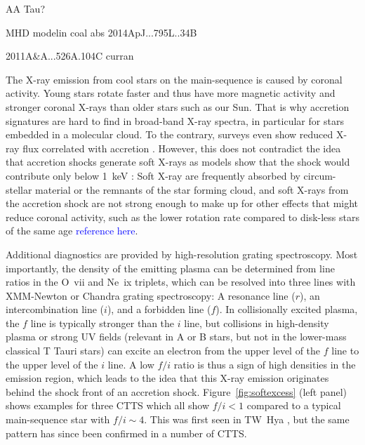 AA Tau?

MHD modelin coal abs 2014ApJ...795L..34B 

2011A&A...526A.104C curran



The X-ray emission from cool stars on the main-sequence is caused by coronal activity. Young stars rotate faster and thus have more magnetic activity and stronger coronal X-rays than older stars such as our Sun. That is why accretion signatures are hard to find in broad-band X-ray spectra, in particular for stars embedded in a molecular cloud. To the contrary, surveys even show reduced X-ray flux correlated with accretion \cite{2005ApJS..160..401P}. However, this does not contradict the idea that accretion shocks generate soft X-rays as models show that the shock would contribute only below 1~keV \cite{1999AstL...25..430L}: Soft X-ray are frequently absorbed by circum-stellar material or the remnants of the star forming cloud, and soft X-rays from the accretion shock are not strong enough to make up for other effects that might reduce coronal activity, such as the lower rotation rate compared to disk-less stars of the same age \textcolor{blue}{reference here}.

Additional diagnostics are provided by high-resolution grating spectroscopy. Most importantly, the density of the emitting plasma can be determined from line ratios in the O~{\sc vii} and Ne~{\sc ix} triplets, which can be resolved into three lines with XMM-Newton or Chandra grating spectroscopy: A resonance line ($r$), an intercombination line ($i$), and a forbidden line ($f$). In collisionally excited plasma, the $f$ line is typically stronger than the $i$ line, but collisions in high-density plasma or strong UV fields (relevant in A or B stars, but not in the lower-mass classical T Tauri stars) can excite an electron from the upper level of the $f$ line to the upper level of the $i$ line. A low $f/i$ ratio is thus a sign of high densities in the emission region, which leads to the idea that this X-ray emission originates behind the shock front of an accretion shock. Figure~\ref{fig:softexcess} (left panel) shows examples for three CTTS which all show $f/i < 1$ compared to a typical main-sequence star with $f/i\sim 4$. This was first seen in TW~Hya \cite{Kastner_2002}, but the same pattern has since been confirmed in a number of CTTS.

